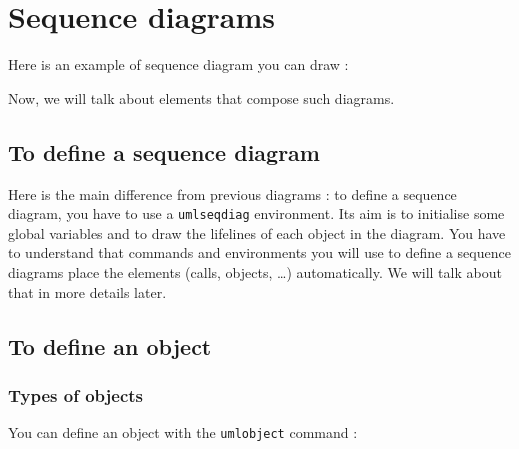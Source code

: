 \documentclass[a4paper,11pt]{report}
\newcommand{\inputTikZ}[1]{%
  }%
\newcommand{\inputTikZ}[1]{%
    \texttt{[image: fig/\#1.pdf]}%
  }%
\begin{document}
\begin{center}
\inputTikZ{statediagstep3}
\end{center}

%
\chapter{Sequence diagrams}\label{c.seq}

Here is an example of sequence diagram you can draw :

\begin{center}
\inputTikZ{seqdiagex}
\end{center}

Now, we will talk about elements that compose such diagrams.

\section{To define a sequence diagram}\label{s.seqdiag}

Here is the main difference from previous diagrams : to define a sequence diagram, you have to use a {\tt umlseqdiag} environment.
Its aim is to initialise some global variables and to draw the lifelines of each object in the diagram. You have to understand that commands and environments you will use to define a sequence diagrams place the elements (calls, objects, \ldots ) automatically. We will talk about that in more details later.

\section{To define an object}\label{s.objs}

\subsection{Types of objects}\label{ss.obj}

You can define an object with the {\tt umlobject} command :

\medskip

\begin{minipage}{0.5\textwidth}

\end{minipage}
\begin{minipage}{0.5\textwidth}
\begin{center}
\inputTikZ{object}
\end{center}
\end{minipage}
\end{document}

